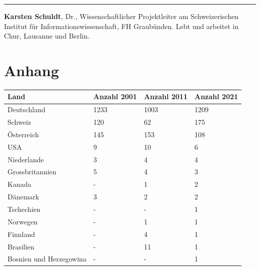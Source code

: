 \documentclass[a4paper,
fontsize=11pt,
oneside,
numbers=noperiodatend,
parskip=half-,
bibliography=totoc,
final
]{scrartcl}
\begin{document}
\begin{center}\rule{0.5\linewidth}{0.5pt}\end{center}

\textbf{Karsten Schuldt}, Dr., Wissenschaftlicher Projektleiter am
Schweizerischen Institut für Informationswissenschaft, FH Graubünden.
Lebt und arbeitet in Chur, Lausanne und Berlin.

\newpage
\hypertarget{anhang}{%
\section{Anhang}\label{anhang}}

\begin{longtable}{llll}
\textbf{Land}             & \textbf{Anzahl 2001} & \textbf{Anzahl 2011} & \textbf{Anzahl 2021} \\
\hline
Deutschland               & 1233                 & 1003                 & 1209                 \\
Schweiz                   & 120                  & 62                   & 175                  \\
Österreich                & 145                  & 153                  & 108                  \\
USA                       & 9                    & 10                   & 6                    \\
Niederlande               & 3                    & 4                    & 4                    \\
Grossbritannien           & 5                    & 4                    & 3                    \\
Kanada                    & -                    & 1                    & 2                    \\
Dänemark                  & 3                    & 2                    & 2                    \\
Tschechien                & -                    & -                    & 1                    \\
Norwegen                  & -                    & 1                    & 1                    \\
Finnland                  & -                    & 4                    & 1                    \\
Brasilien                 & -                    & 11                   & 1                    \\
Bosnien und   Herzegowina & -                    & -                    & 1                    \\

\end{longtable}
\end{document}
